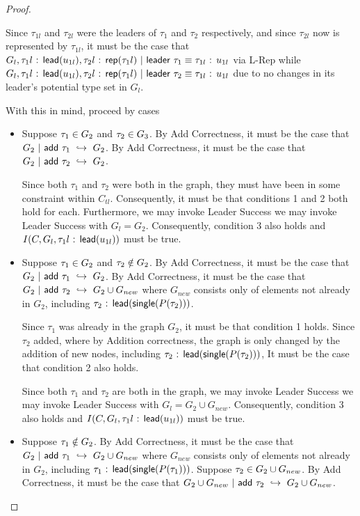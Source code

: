 \begin{proof}
\begin{itemize}
    Since $\tau_{1l}$ and $\tau_{2l}$ were the leaders of $\tau_1$ and $\tau_2$ respectively, and since $\tau_{2l}$ now is represented by $\tau_{1l}$, it must be the case that $G_l, \tau_1l\normalfont\textsf{ : }\normalfont\textsf{lead}(u_{1l}), \tau_2l\normalfont\textsf{ : }\normalfont\textsf{rep}(\tau_1l)~|~\normalfont\textsf{leader}~\tau_1 \equiv \tau_{1l}\normalfont\textsf{ : }u_{1l}$ via L-Rep while $G_l, \tau_1l\normalfont\textsf{ : }\normalfont\textsf{lead}(u_{1l}), \tau_2l\normalfont\textsf{ : }\normalfont\textsf{rep}(\tau_1l)~|~\normalfont\textsf{leader}~\tau_2 \equiv \tau_{1l}\normalfont\textsf{ : }u_{1l}$ due to no changes in its leader's potential type set in $G_l$.

    With this in mind, proceed by cases
    \begin{itemize}
        \item Suppose $\tau_1 \in G_2$ and $\tau_2 \in G_3$. By Add Correctness, it must be the case that $G_2~|~\normalfont\textsf{add}~\tau_1 ~\hookrightarrow~ G_2$. By Add Correctness, it must be the case that $G_2~|~\normalfont\textsf{add}~\tau_2 ~\hookrightarrow~ G_2$. 

        
        Since both $\tau_1$ and $\tau_2$ were both in the graph, they must have been in some constraint within $C_{tl}$. Consequently, it must be that conditions 1 and 2 both hold for each. Furthermore, we may invoke Leader Success we may invoke Leader Success with $G_l = G_2$. Consequently, condition 3 also holds and $I(C, G_l, \tau_1l\normalfont\textsf{ : }\normalfont\textsf{lead}(u_{1l}))$ must be true.
        

        \item Suppose $\tau_1 \in G_2$ and $\tau_2 \notin G_2$. By Add Correctness, it must be the case that $G_2~|~\normalfont\textsf{add}~\tau_1 ~\hookrightarrow~ G_2$. By Add Correctness, it must be the case that $G_2~|~\normalfont\textsf{add}~\tau_2 ~\hookrightarrow~ G_2 \cup G_{new}$ where $G_{new}$ consists only of elements not already in $G_2$, including $\tau_2\normalfont\textsf{ : }\normalfont\textsf{lead}(\normalfont\textsf{single}(P(\tau_2)))$. 

        Since $\tau_1$ was already in the graph $G_2$, it must be that condition 1 holds. Since $\tau_2$ added, where by Addition correctness, the graph is only changed by the addition of new nodes, including $\tau_2\normalfont\textsf{ : }\normalfont\textsf{lead}(\normalfont\textsf{single}(P(\tau_2)))$, It must be the case that condition 2 also holds. 

        Since both $\tau_1$ and $\tau_2$ are both in the graph, we may invoke Leader Success we may invoke Leader Success with $G_l = G_2 \cup G_{new}$. Consequently, condition 3 also holds and $I(C, G_l, \tau_1l\normalfont\textsf{ : }\normalfont\textsf{lead}(u_{1l}))$ must be true.

        \item Suppose $\tau_1 \notin G_2$. By Add Correctness, it must be the case that $G_2~|~\normalfont\textsf{add}~\tau_1 ~\hookrightarrow~ G_2 \cup G_{new}$ where $G_{new}$ consists only of elements not already in $G_2$, including $\tau_1\normalfont\textsf{ : }\normalfont\textsf{lead}(\normalfont\textsf{single}(P(\tau_1)))$. Suppose $\tau_2 \in G_2 \cup G_{new}$. By Add Correctness, it must be the case that $G_2 \cup G_{new}~|~\normalfont\textsf{add}~\tau_2 ~\hookrightarrow~ G_2 \cup G_{new}$.


\end{itemize}
\end{itemize}
\end{proof}

